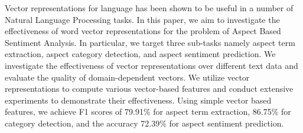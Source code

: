 Vector representations for language has been shown to be useful in a number of Natural Language Processing tasks. In this paper, we aim to investigate the effectiveness of word vector representations for the problem of Aspect Based Sentiment Analysis. In particular, we target three sub-tasks namely aspect term extraction, aspect category detection, and aspect sentiment prediction. We investigate the effectiveness of vector representations over different text data and evaluate the quality of domain-dependent vectors. We utilize vector representations to compute various vector-based features and conduct extensive experiments to demonstrate their effectiveness. Using simple vector based features, we achieve F1 scores of 79.91\% for aspect term extraction, 86.75\% for category detection, and the accuracy 72.39\% for aspect sentiment prediction.

